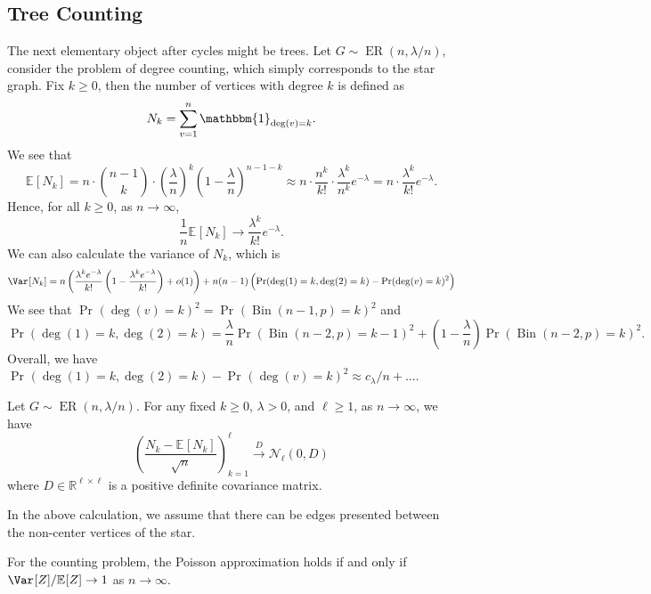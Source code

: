 \subsection{Tree Counting}
The next elementary object after cycles might be trees. Let \(G \sim \operatorname{ER}(n, \lambda / n) \), consider the problem of degree counting, which simply corresponds to the star graph. Fix \(k \geq 0\), then the number of vertices with degree \(k\) is defined as
\[
	N_k = \sum_{v=1}^{n} \mathbbm{1}_{\deg (v) = k}.
\]
We see that
\[
	\mathbb{E}_{}[N_k]
	= n \cdot \binom{n-1}{k} \cdot \left( \frac{\lambda}{n} \right) ^k \left( 1 - \frac{\lambda}{n} \right) ^{n-1-k}
	\approx n \cdot \frac{n^k}{k!} \cdot \frac{\lambda ^k}{n^k} e^{-\lambda }
	= n \cdot \frac{\lambda ^k}{k!} e^{-\lambda }.
\]
Hence, for all \(k \geq 0\), as \(n \to \infty \),
\[
	\frac{1}{n} \mathbb{E}_{}[N_k]
	\to \frac{\lambda ^k}{k!} e^{-\lambda }.
\]
We can also calculate the variance of \(N_k\), which is
\[
	\Var_{}[N_k]
	= n \left( \frac{\lambda ^k e^{-\lambda }}{k!} \left( 1 - \frac{\lambda ^k e^{-\lambda }}{k!} \right) + o(1) \right) + n(n-1) \left( \Pr_{}(\deg (1) = k, \deg (2) = k) - \Pr_{}(\deg (v) = k)^2 \right)
\]
We see that \(\Pr_{}(\deg (v) = k)^2 = \Pr_{}(\operatorname{Bin}(n-1, p) =k)^2\) and
\[
	\Pr_{}(\deg (1) = k, \deg (2) = k)
	= \frac{\lambda}{n} \Pr_{}(\operatorname{Bin}(n-2, p) = k-1 ) ^2 + \left( 1 - \frac{\lambda}{n} \right) \Pr_{}(\operatorname{Bin}(n-2, p) = k )^2.
\]
Overall, we have \(\Pr_{}(\deg (1) = k, \deg (2) = k) - \Pr_{}(\deg (v) = k)^2 \approx c_\lambda / n + \dots \).

\begin{theorem}
	Let \(G \sim \operatorname{ER}(n, \lambda / n) \). For any fixed \(k \geq 0\), \(\lambda > 0\), and \(\ell \geq 1\), as \(n \to \infty \), we have
	\[
		\left( \frac{N_k - \mathbb{E}_{}[N_k] }{\sqrt{n} } \right) _{k=1}^{\ell }
		\overset{D}{\to} \mathcal{N} _\ell (0, D)
	\]
	where \(D \in \mathbb{R} ^{\ell \times \ell }\) is a positive definite covariance matrix.
\end{theorem}

\begin{note}
	In the above calculation, we assume that there can be edges presented between the non-center vertices of the star.
\end{note}

\begin{remark}
	For the counting problem, the Poisson approximation holds if and only if \(\Var_{}[Z] / \mathbb{E}_{}[Z] \to 1\) as \(n \to \infty \).
\end{remark}

